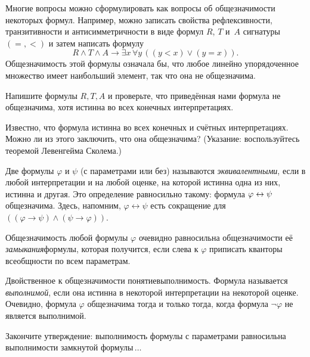 Многие вопросы можно сформулировать как вопросы об
общезначимости некоторых формул. Например, можно записать
свойства рефлексивности, транзитивности и антисимметричности в
виде формул $R$, $T$ и~$A$ сигнатуры $({=},{<})$ и затем
написать формулу
        $$
R \land T \land A \to \exists x \,\forall y\, ((y<x)\lor (y=x)).
        $$
Общезначимость этой формулы означала бы, что любое линейно
упорядоченное множество имеет наибольший элемент, так что она не
общезначима.

\begin{problem}
Напишите формулы $R,T,A$ и проверьте, что приведённая нами
формула не общезначима, хотя истинна во всех конечных
интерпретациях.
\end{problem}

\begin{problem}
Известно, что формула истинна во всех конечных и счётных
интерпретациях. Можно ли из этого заключить, что она
общезначима? (Указание: воспользуйтесь теоремой Левенгейма\ч
Сколема.)
\end{problem}

Две формулы $\varphi$ и $\psi$ (с параметрами или без)
называются \emph{эквивалентными},%
%
если в любой интерпретации и
на любой оценке, на которой истинна одна из них, истинна и
другая. Это определение равносильно такому: формула
$\varphi\hm\leftrightarrow\psi$ общезначима. Здесь, напомним,
$\varphi\leftrightarrow\psi$ есть сокращение для
$((\varphi\to\psi)\land(\psi\to\varphi))$.

Общезначимость любой формулы $\varphi$ очевидно равносильна
общезначимости её \emph{замыкания}\т формулы,%
%
которая получится,
если слева к $\varphi$ приписать кванторы всеобщности по всем
параметрам.

Двойственное к общезначимости понятие\т выполнимость. Формула
называется \emph{выполнимой},%
%
если она истинна в некоторой
интерпретации на некоторой оценке. Очевидно, формула $\varphi$
общезначима тогда и только тогда, когда формула $\lnot\varphi$
не является выполнимой.

\begin{problem}
Закончите утверждение:
выполнимость формулы с параметрами равносильна выполнимости
замкнутой формулы\,$\ldots$
\end{problem}

